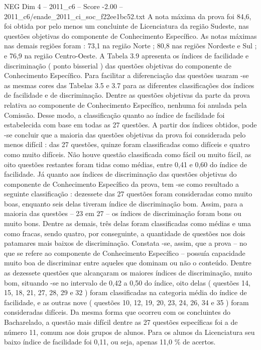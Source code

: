 \begin{textsample}{NEG Dim 4 – 2011\_c6 – Score -2.00 – 2011\_c6/enade\_2011\_ci\_soc\_f22ee1bc52.txt}
A nota máxima da prova foi 84,6, foi obtida por pelo menos um concluinte de Licenciatura da região Sudeste, nas questões objetivas do componente de Conhecimento Específico.
As notas máximas nas demais regiões foram : 73,1 na região Norte ; 80,8 nas regiões Nordeste e Sul ; e 76,9 na região Centro-Oeste.
A Tabela 3.9 apresenta os índices de facilidade e discriminação ( ponto bisserial ) das questões objetivas do componente de Conhecimento Específico.
Para facilitar a diferenciação das questões usaram -se as mesmas cores das Tabelas 3.5 e 3.7 para as diferentes classificações dos índices de facilidade e de discriminação.
Dentre as questões objetivas da parte da prova relativa ao componente de Conhecimento Específico, nenhuma foi anulada pela Comissão.
Desse modo, a classificação quanto ao índice de facilidade foi estabelecida com base em todas as 27 questões.
A partir dos índices obtidos, pode -se concluir que a maioria das questões objetivas da prova foi considerada pelo menos difícil : das 27 questões, quinze foram classificadas como difíceis e quatro como muito difíceis.
Não houve questão classificada como fácil ou muito fácil, as oito questões restantes foram tidas como médias, entre 0,41 e 0,60 do índice de facilidade.
Já quanto aos índices de discriminação das questões objetivas do componente de Conhecimento Específico da prova, tem -se como resultado a seguinte classificação : dezessete das 27 questões foram consideradas como muito boas, enquanto seis delas tiveram índice de discriminação bom.
Assim, para a maioria das questões – 23 em 27 – os índices de discriminação foram bons ou muito bons.
Dentre as demais, três delas foram classificadas como médias e uma como fracas, sendo quatro, por conseguinte, a quantidade de questões nos dois patamares mais baixos de discriminação.
Constata -se, assim, que a prova – no que se refere ao componente de Conhecimento Específico – possuía capacidade muito boa de discriminar entre aqueles que dominam ou não o conteúdo.
Dentre as dezessete questões que alcançaram os maiores índices de discriminação, muito bom, situando -se no intervalo de 0,42 a 0,50 do índice, oito delas ( questões 14, 15, 18, 21, 27, 28, 29 e 32 ) foram classificadas na categoria média do índice de facilidade, e as outras nove ( questões 10, 12, 19, 20, 23, 24, 26, 34 e 35 ) foram consideradas difíceis.
Da mesma forma que ocorreu com os concluintes do Bacharelado, a questão mais difícil dentre as 27 questões específicas foi a de número 11, comum aos dois grupos de alunos.
Para os alunos da Licenciatura seu baixo índice de facilidade foi 0,11, ou seja, apenas 11,0 \% de acertos.

\end{textsample}
